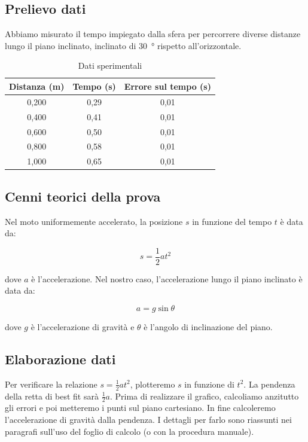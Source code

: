 \subsection{Prelievo dati}
Abbiamo misurato il tempo impiegato dalla sfera per percorrere diverse distanze lungo il piano inclinato, inclinato di \SI{30}{\degree} rispetto all'orizzontale.

\begin{table}[!htbp] 
    \centering
    \begin{tabular}{@{}ccc@{}}
        \toprule
        Distanza (\si{\metre}) & Tempo (\si{\second}) & Errore sul tempo (\si{\second}) \\
        \midrule
        0,200 & 0,29 & 0,01 \\
        0,400 & 0,41 & 0,01 \\
        0,600 & 0,50 & 0,01 \\
        0,800 & 0,58 & 0,01 \\
        1,000 & 0,65 & 0,01 \\
        \bottomrule
    \end{tabular}
    \caption{Dati sperimentali}
    \label{tab:datitab}
\end{table}

\subsection{Cenni teorici della prova}
Nel moto uniformemente accelerato, la posizione $s$ in funzione del tempo $t$ è data da:

\begin{equation}
    s = \frac{1}{2}at^2
\end{equation}

dove $a$ è l'accelerazione. Nel nostro caso, l'accelerazione lungo il piano inclinato è data da:

\begin{equation}
    a = g\sin\theta
\end{equation}

dove $g$ è l'accelerazione di gravità e $\theta$ è l'angolo di inclinazione del piano.

\subsection{Elaborazione dati}
Per verificare la relazione $s = \frac{1}{2}at^2$, plotteremo $s$ in funzione di $t^2$.
 La pendenza della retta di best fit sarà $\frac{1}{2}a$. Prima di realizzare il grafico,
 calcoliamo anzitutto gli errori e poi metteremo i punti sul piano cartesiano. In fine calcoleremo
 l'accelerazione di gravità dalla pendenza. I dettagli per farlo sono riassunti nei paragrafi
 sull'uso del foglio di calcolo (o con la procedura manuale).

